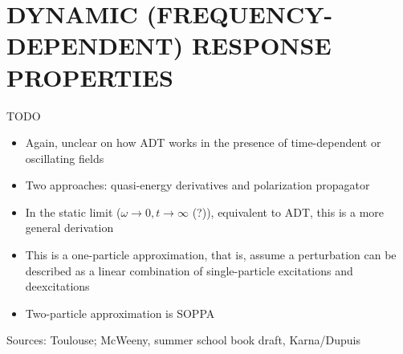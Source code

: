 \documentclass[%
class = book,%
crop = false,%
float = true,%
multi = true,%
preview = false,%
]{standalone}
\newcommand{\caps}[1]{\uppercase{#1}}
\begin{document}
\section{\texorpdfstring{\caps{Dynamic (frequency-dependent) response properties}}{Static (time-independent) response properties}}
\label{sec:dynamic-properties}

TODO

\begin{itemize}
\item Again, unclear on how ADT works in the presence of time-dependent or oscillating fields
\item Two approaches: quasi-energy derivatives and polarization propagator
\item In the static limit (\(\omega \rightarrow 0, t \rightarrow \infty\) (?)), equivalent to ADT, this is a more general derivation
\item This is a one-particle approximation, that is, assume a perturbation can be described as a linear combination of single-particle excitations and deexcitations
\item Two-particle approximation is SOPPA
\end{itemize}

Sources: Toulouse; McWeeny, summer school book draft, Karna/Dupuis


\end{document}
